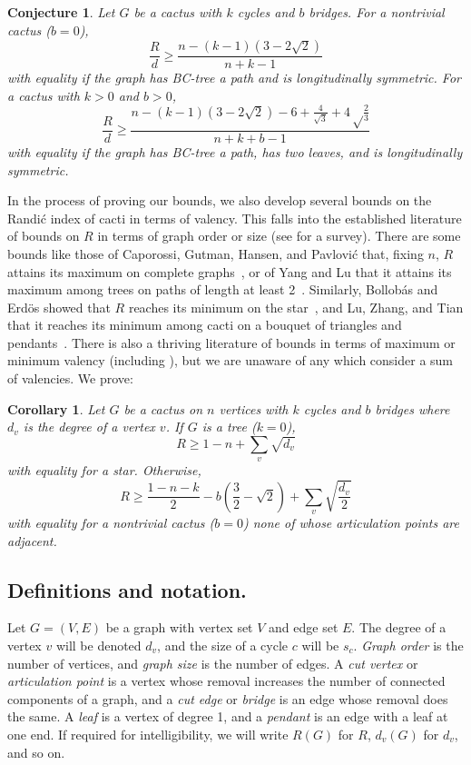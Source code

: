 \documentclass{amsart}
\newtheorem{cor}[thm]{Corollary}
\newtheorem{conj}[thm]{Conjecture}
\theoremstyle{definition}
\begin{document}
\begin{conj}\label{conj:d_new}
Let $G$ be a cactus with $k$ cycles and $b$ bridges. For a nontrivial cactus ($b = 0$), 
\[\frac{R}{d} \geq \frac{n - (k-1)(3-2\sqrt 2)}{n+k-1}\]
with equality if the graph has BC-tree a path and is longitudinally symmetric. For a cactus with $k>0$ and $b>0$,
\[\frac{R}{d} \geq \frac{ n - (k-1)\left(3 - 2\sqrt 2 \right) - 6 + \frac{4}{\sqrt 3} + 4\sqrt\frac{2}{3}}{n+k+b-1}\]
with equality if the graph has BC-tree a path, has two leaves, and is longitudinally symmetric. 
\end{conj}

In the process of proving our bounds, we also develop several bounds on the Randi\'c index of cacti in terms of valency. This falls into the established literature of bounds on $R$ in terms of graph order or size (see \cite{favaron2003randic} for a survey). There are some bounds like those of Caporossi, Gutman, Hansen, and Pavlovi\'c that, fixing $n$, $R$ attains its maximum on complete graphs~\cite{caporossi2003graphs}, or of Yang and Lu that it attains its maximum among trees on paths of length at least 2~\cite{yang2011randic}. Similarly, Bollob\'as and Erd\"os showed that $R$ reaches its minimum on the star~\cite{bollobas1998extremal}, and Lu, Zhang, and Tian that it reaches its minimum among cacti on a bouquet of triangles and pendants~\cite{lu2006randic}. There is also a thriving literature of bounds in terms of maximum or minimum valency (including \cite{gutman2000graphs, aouchiche2007variable, suil2018sharp, suil2018sharp}), but we are unaware of any which consider a sum of valencies. We prove:
\begin{cor}\label{cor:valency}
Let $G$ be a cactus on $n$ vertices with $k$ cycles and $b$ bridges where $d_v$ is the degree of a vertex $v$. If $G$ is a tree ($k=0$), 
\[R \geq 1 - n + \sum_v \sqrt{d_v}\]
with equality for a star. Otherwise,
\[R \geq \frac{1 - n-k}{2} - b\left(\frac{3}{2}-\sqrt2\right) + \sum_v \sqrt{\frac{d_v}{2}} \]
with equality for a nontrivial cactus ($b=0$) none of whose articulation points are adjacent.
\end{cor}


\subsection*{Definitions and notation.} Let $G=(V,E)$ be a graph with vertex set $V$ and edge set $E$. The degree of a vertex $v$ will be denoted $d_v$, and the size of a cycle $c$ will be $s_c$. \emph{Graph order} is the number of vertices, and \emph{graph size} is the number of edges. A \emph{cut vertex} or \emph{articulation point} is a vertex whose removal increases the number of connected components of a graph, and a \emph{cut edge} or \emph{bridge} is an edge whose removal does the same. A \emph{leaf} is a vertex of degree 1, and a \emph{pendant} is an edge with a leaf at one end. If required for intelligibility, we will write $R(G)$ for $R$, $d_v(G)$ for $d_v$, and so on.
\end{document}
